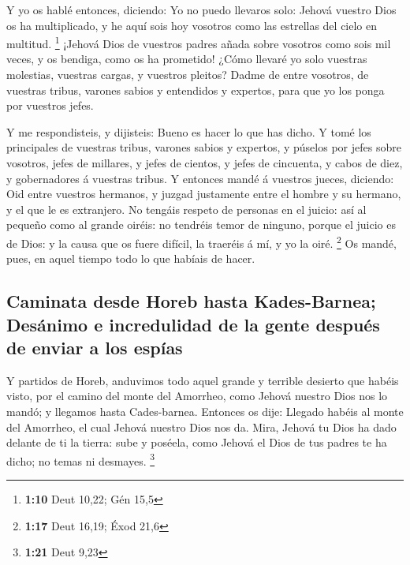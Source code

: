  Y yo os hablé entonces, diciendo: Yo no puedo llevaros
solo:  Jehová vuestro Dios os ha multiplicado, y he aquí
sois hoy vosotros como las estrellas del cielo en multitud. \footnote{\textbf{1:10}
  Deut 10,22; Gén 15,5}  ¡Jehová Dios de vuestros padres
añada sobre vosotros como sois mil veces, y os bendiga, como os ha
prometido!  ¿Cómo llevaré yo solo vuestras molestias,
vuestras cargas, y vuestros pleitos?  Dadme de entre
vosotros, de vuestras tribus, varones sabios y entendidos y expertos,
para que yo los ponga por vuestros jefes.

 Y me respondisteis, y dijisteis: Bueno es hacer lo que
has dicho.  Y tomé los principales de vuestras tribus,
varones sabios y expertos, y púselos por jefes sobre vosotros, jefes de
millares, y jefes de cientos, y jefes de cincuenta, y cabos de diez, y
gobernadores á vuestras tribus.  Y entonces mandé á
vuestros jueces, diciendo: Oid entre vuestros hermanos, y juzgad
justamente entre el hombre y su hermano, y el que le es extranjero.
 No tengáis respeto de personas en el juicio: así al
pequeño como al grande oiréis: no tendréis temor de ninguno, porque el
juicio es de Dios: y la causa que os fuere difícil, la traeréis á mí, y
yo la oiré. \footnote{\textbf{1:17} Deut 16,19; Éxod 21,6}
 Os mandé, pues, en aquel tiempo todo lo que habíais de
hacer.

\hypertarget{caminata-desde-horeb-hasta-kades-barnea-desuxe1nimo-e-incredulidad-de-la-gente-despuuxe9s-de-enviar-a-los-espuxedas}{%
\subsection{Caminata desde Horeb hasta Kades-Barnea; Desánimo e
incredulidad de la gente después de enviar a los
espías}\label{caminata-desde-horeb-hasta-kades-barnea-desuxe1nimo-e-incredulidad-de-la-gente-despuuxe9s-de-enviar-a-los-espuxedas}}

 Y partidos de Horeb, anduvimos todo aquel grande y
terrible desierto que habéis visto, por el camino del monte del
Amorrheo, como Jehová nuestro Dios nos lo mandó; y llegamos hasta
Cades-barnea.  Entonces os dije: Llegado habéis al monte
del Amorrheo, el cual Jehová nuestro Dios nos da.  Mira,
Jehová tu Dios ha dado delante de ti la tierra: sube y poséela, como
Jehová el Dios de tus padres te ha dicho; no temas ni desmayes.
\footnote{\textbf{1:21} Deut 9,23}

